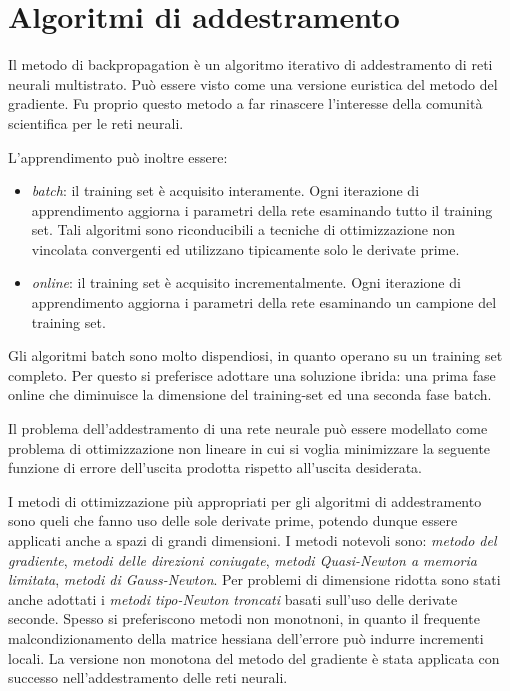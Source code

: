 \chapter{Algoritmi di addestramento}
\label{sec:neural-networks.learning.algorithms}
Il metodo di backpropagation è un algoritmo iterativo di addestramento di reti neurali multistrato. Può essere visto come una versione euristica del metodo del gradiente. Fu proprio questo metodo a far rinascere l'interesse della comunità scientifica per le reti neurali.

L'apprendimento può inoltre essere:

\begin{itemize}
  \item \textit{batch}: il training set è acquisito interamente. Ogni iterazione di apprendimento aggiorna i parametri della rete esaminando tutto il training set. Tali algoritmi sono riconducibili a tecniche di ottimizzazione non vincolata convergenti ed utilizzano tipicamente solo le derivate prime.

  \item \textit{online}: il training set è acquisito incrementalmente. Ogni iterazione di apprendimento aggiorna i parametri della rete esaminando un campione del training set.
\end{itemize}

Gli algoritmi batch sono molto dispendiosi, in quanto operano su un training set completo. Per questo si preferisce adottare una soluzione ibrida: una prima fase online che diminuisce la dimensione del training-set ed una seconda fase batch.

Il problema dell'addestramento di una rete neurale può essere modellato come problema di ottimizzazione non lineare in cui si voglia minimizzare la seguente funzione di errore dell'uscita prodotta rispetto all'uscita desiderata.

I metodi di ottimizzazione più appropriati per gli algoritmi di addestramento sono queli che fanno uso delle sole derivate prime, potendo dunque essere applicati anche a spazi di grandi dimensioni. I metodi notevoli sono: \textit{metodo del gradiente}, \textit{metodi delle direzioni coniugate}, \textit{metodi Quasi-Newton a memoria limitata}, \textit{metodi di Gauss-Newton}.
Per problemi di dimensione ridotta sono stati anche adottati i \textit{metodi tipo-Newton troncati} basati sull'uso delle derivate seconde.
Spesso si preferiscono metodi non monotnoni, in quanto il frequente malcondizionamento della matrice hessiana dell'errore può indurre incrementi locali.
La versione non monotona del metodo del gradiente è stata applicata con successo nell'addestramento delle reti neurali.

